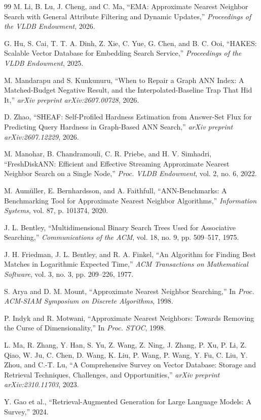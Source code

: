 \documentclass{ieeeaccess}
\begin{document}
\begin{thebibliography}{99}
M. Li, B. Lu, J. Cheng, and C. Ma,
``EMA: Approximate Nearest Neighbor Search with General Attribute Filtering and Dynamic Updates,''
\emph{Proceedings of the VLDB Endowment}, 2026.

G. Hu, S. Cai, T. T. A. Dinh, Z. Xie, C. Yue, G. Chen, and B. C. Ooi,
``HAKES: Scalable Vector Database for Embedding Search Service,''
\emph{Proceedings of the VLDB Endowment}, 2025.

M. Mandarapu and S. Kunkunuru,
``When to Repair a Graph ANN Index: A Matched-Budget Negative Result, and the Interpolated-Baseline Trap That Hid It,''
\emph{arXiv preprint arXiv:2607.00728}, 2026.

D. Zhao,
``SHEAF: Self-Profiled Hardness Estimation from Answer-Set Flux for Predicting Query Hardness in Graph-Based ANN Search,''
\emph{arXiv preprint arXiv:2607.12229}, 2026.

M. Manohar, B. Chandramouli, C. R. Priebe, and H. V. Simhadri,
``FreshDiskANN: Efficient and Effective Streaming Approximate Nearest Neighbor Search on a Single Node,''
\emph{Proc. VLDB Endowment}, vol. 2, no. 6, 2022.

M. Aum\"uller, E. Bernhardsson, and A. Faithfull,
``ANN-Benchmarks: A Benchmarking Tool for Approximate Nearest Neighbor Algorithms,''
\emph{Information Systems}, vol. 87, p. 101374, 2020.

J. L. Bentley,
``Multidimensional Binary Search Trees Used for Associative Searching,''
\emph{Communications of the ACM}, vol. 18, no. 9, pp. 509--517, 1975.

J. H. Friedman, J. L. Bentley, and R. A. Finkel,
``An Algorithm for Finding Best Matches in Logarithmic Expected Time,''
\emph{ACM Transactions on Mathematical Software}, vol. 3, no. 3, pp. 209--226, 1977.

S. Arya and D. M. Mount,
``Approximate Nearest Neighbor Searching,''
In \emph{Proc. ACM-SIAM Symposium on Discrete Algorithms}, 1998.

P. Indyk and R. Motwani,
``Approximate Nearest Neighbors: Towards Removing the Curse of Dimensionality,''
In \emph{Proc. STOC}, 1998.

L. Ma, R. Zhang, Y. Han, S. Yu, Z. Wang, Z. Ning, J. Zhang, P. Xu, P. Li, Z. Qiao, W. Ju, C. Chen, D. Wang, K. Liu, P. Wang, P. Wang, Y. Fu, C. Liu, Y. Zhou, and C.-T. Lu,
``A Comprehensive Survey on Vector Database: Storage and Retrieval Techniques, Challenges, and Opportunities,''
\emph{arXiv preprint arXiv:2310.11703}, 2023.

Y. Gao et al.,
``Retrieval-Augmented Generation for Large Language Models: A Survey,''
2024.

\end{thebibliography}
\end{document}
